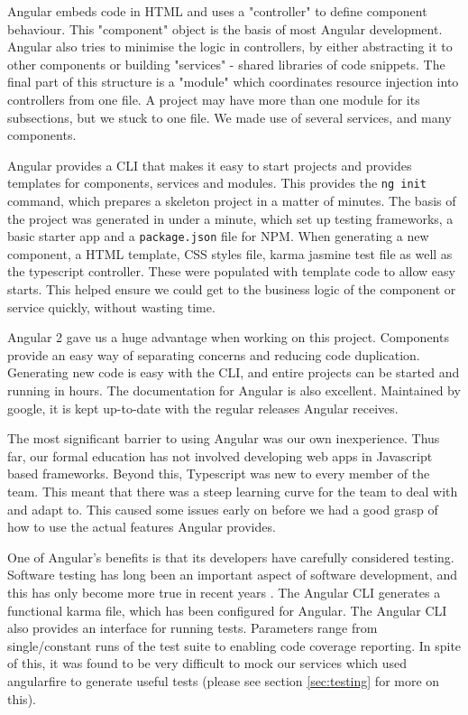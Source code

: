 \documentclass{l3proj}
\begin{document}
Angular embeds code in HTML and uses a "controller" to define component behaviour. This
 "component" object is the basis of most Angular development. Angular also tries
 to minimise the logic in controllers, by either abstracting it to other components
 or building "services" - shared libraries of code snippets. The final part of this
 structure is a "module" which coordinates resource injection into controllers from one
 file. A project may have more than one module for its subsections, but we stuck to
 one file. We made use of several services, and many components.

Angular provides a CLI that makes it easy to start projects and provides
 templates for components, services and modules. This provides the \texttt{ng init}
 command, which prepares a skeleton project in a matter of minutes.
 The basis of the project was generated in under a minute, which set up
 testing frameworks, a basic starter app and a \texttt{package.json} file for NPM.
 When generating a new component, a HTML template, CSS styles file, karma
 jasmine test file as well as the typescript controller. These were populated
 with template code to allow easy starts. This helped ensure we could get to
 the business logic of the component or service quickly, without wasting time.

  

Angular 2 gave us a huge advantage when working on this project. Components provide
 an easy way of separating concerns and reducing code duplication. Generating new
 code is easy with the CLI, and entire projects can be started and running
 in hours. The documentation for Angular is also excellent. Maintained by google,
 it is kept up-to-date with the regular releases Angular receives.

The most significant barrier to using Angular was our own inexperience.
 Thus far, our formal education has not involved developing web apps in
 Javascript based frameworks. Beyond this, Typescript was new to every
 member of the team. This meant that there was a steep learning curve for
 the team to deal with and adapt to. This caused some issues early on
 before we had a good grasp of how to use the actual features Angular
 provides.

One of Angular's benefits is that its developers have carefully
 considered testing. Software testing has long been an important
 aspect of software development, and this has only become more true
 in recent years \cite{tuteja2012testing}. The Angular CLI generates
 a functional karma file, which has been configured for Angular. The
 Angular CLI also provides an interface for running tests. Parameters
 range from single/constant runs of the test suite to enabling code
 coverage reporting. In spite of this, it was found to be very
 difficult to mock our services which used angularfire to generate
 useful tests (please see section \ref{sec:testing} for more on this).
\end{document}
